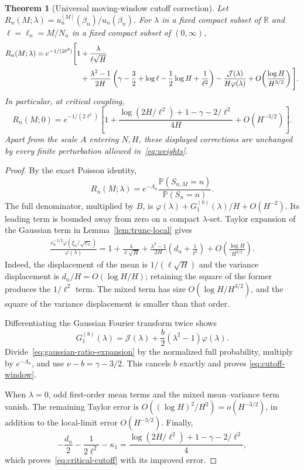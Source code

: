 \documentclass[11pt,a4paper]{article}
\numberwithin{equation}{section}
\newtheorem{theorem}{Theorem}[section]
\theoremstyle{definition}
\theoremstyle{remark}
\newcommand{\R}{\mathbb R}
\newcommand{\Prob}{\mathbb P}
\newcommand{\ph}{\varphi}
\newcommand{\cJ}{\mathcal J}
\begin{document}
\begin{theorem}[Universal moving-window cutoff correction]
\label{thm:cutoff-window}
Let
\(R_n(M;\lambda)=u_n^{[M]}(\beta_n)/u_n(\beta_n)\).
For \(\lambda\) in a fixed compact subset of \(\R\) and
\(\ell=\ell_n=M/N_n\) in a fixed compact subset of \((0,\infty)\),
\begin{align}
 R_n(M;\lambda)=e^{-1/(2\ell^2)}
 \Bigg[1&+\frac{\lambda}{\ell\sqrt H}\notag\\
 &+\frac{\lambda^2-1}{2H}
 \left(\gamma-\frac32+\log\ell-\frac12\log H+\frac1{\ell^2}\right)
 -\frac{\cJ(\lambda)}{H\ph(\lambda)}
 +O\!\left(\frac{\log H}{H^{3/2}}\right)\Bigg].
 \label{eq:cutoff-window}
\end{align}
In particular, at critical coupling,
\begin{equation}
 R_n(M;0)=e^{-1/(2\ell^2)}
 \left[1+\frac{\log(2H/\ell^2)+1-\gamma-2/\ell^2}{4H}
 +O(H^{-3/2})\right].
 \label{eq:critical-cutoff}
\end{equation}
Apart from the scale \(A\) entering \(N,H\), these displayed corrections
are unchanged by every finite perturbation allowed in~\eqref{eq:weights}.
\end{theorem}
\begin{proof}
By the exact Poisson identity,
\[
 R_n(M;\lambda)=e^{-\Lambda_n}
 \frac{\Prob(S_{n,M}=n)}{\Prob(S_n=n)}.
\]
The full denominator, multiplied by \(B\), is
\(\ph(\lambda)+G_1^{(b)}(\lambda)/H+O(H^{-2})\).
Its leading term is bounded away from zero on a compact \(\lambda\)-set.
Taylor expansion of the Gaussian term in Lemma~\ref{lem:trunc-local} gives
\begin{align}
 \frac{v_n^{-1/2}\ph(\xi_n/\sqrt{v_n})}{\ph(\lambda)}
 =1+\frac{\lambda}{\ell\sqrt H}
 +\frac{\lambda^2-1}{2H}\left(d_n+\frac1{\ell^2}\right)
 +O\!\left(\frac{\log H}{H^{3/2}}\right).
 \label{eq:gaussian-ratio-expansion}
\end{align}
Indeed, the displacement of the mean is \(1/(\ell\sqrt H)\) and the
variance displacement is \(d_n/H=O(\log H/H)\); retaining the square of
the former produces the \(1/\ell^2\) term. The mixed term has size
\(O(\log H/H^{3/2})\), and the square of the variance displacement is
smaller than that order.

Differentiating the Gaussian Fourier transform twice shows
\begin{equation}
 G_1^{(b)}(\lambda)
 =\cJ(\lambda)+\frac b2(\lambda^2-1)\ph(\lambda).
 \label{eq:b-cancellation}
\end{equation}
Divide~\eqref{eq:gaussian-ratio-expansion} by the normalized full
probability, multiply by \(e^{-\Lambda_n}\), and use
\(\nu-b=\gamma-3/2\). This cancels \(b\) exactly and proves
\eqref{eq:cutoff-window}.

When \(\lambda=0\), odd first-order mean terms and the mixed
mean--variance term vanish. The remaining Taylor error is
\(O((\log H)^2/H^2)=o(H^{-3/2})\), in addition to the local-limit error
\(O(H^{-3/2})\). Finally,
\[
 -\frac{d_n}{2}-\frac1{2\ell^2}-\kappa_1
 =\frac{\log(2H/\ell^2)+1-\gamma-2/\ell^2}{4},
\]
which proves~\eqref{eq:critical-cutoff} with its improved error.
\end{proof}
\end{document}
